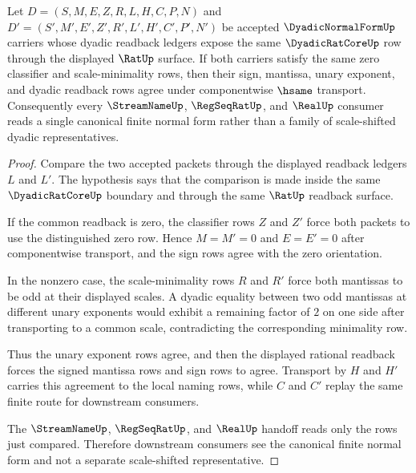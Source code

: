 \begin{theorem}
\label{thm:dyadic-normal-form-canonical-readback}
Let $D=(S,M,E,Z,R,L,H,C,P,N)$ and $D'=(S',M',E',Z',R',L',H',C',P',N')$ be accepted $\DyadicNormalFormUp$ carriers whose dyadic readback ledgers expose the same $\DyadicRatCoreUp$ row through the displayed $\RatUp$ surface. If both carriers satisfy the same zero classifier and scale-minimality rows, then their sign, mantissa, unary exponent, and dyadic readback rows agree under componentwise $\hsame$ transport. Consequently every $\StreamNameUp$, $\RegSeqRatUp$, and $\RealUp$ consumer reads a single canonical finite normal form rather than a family of scale-shifted dyadic representatives.
\end{theorem}
\begin{proof}
Compare the two accepted packets through the displayed readback ledgers $L$ and $L'$. The hypothesis says that the comparison is made inside the same $\DyadicRatCoreUp$ boundary and through the same $\RatUp$ readback surface.

If the common readback is zero, the classifier rows $Z$ and $Z'$ force both packets to use the distinguished zero row. Hence $M=M'=0$ and $E=E'=0$ after componentwise transport, and the sign rows agree with the zero orientation.

In the nonzero case, the scale-minimality rows $R$ and $R'$ force both mantissas to be odd at their displayed scales. A dyadic equality between two odd mantissas at different unary exponents would exhibit a remaining factor of $2$ on one side after transporting to a common scale, contradicting the corresponding minimality row.

Thus the unary exponent rows agree, and then the displayed rational readback forces the signed mantissa rows and sign rows to agree. Transport by $H$ and $H'$ carries this agreement to the local naming rows, while $C$ and $C'$ replay the same finite route for downstream consumers.

The $\StreamNameUp$, $\RegSeqRatUp$, and $\RealUp$ handoff reads only the rows just compared. Therefore downstream consumers see the canonical finite normal form and not a separate scale-shifted representative.
\end{proof}


